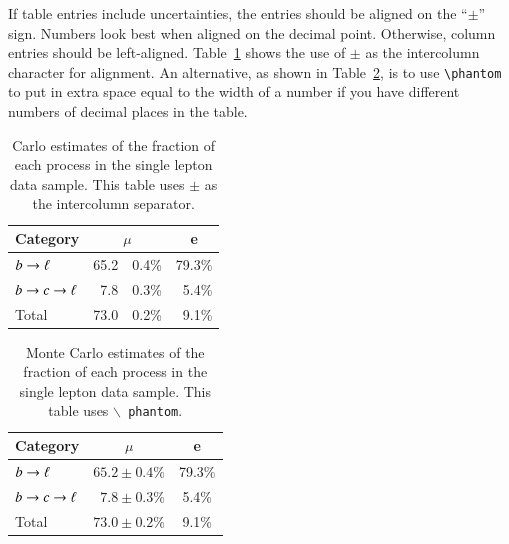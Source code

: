 \documentclass[11pt,a4paper]{../atlasnote}
\newcommand{\pho}{\phantom{0}}
\newcommand{\bslash}{\ensuremath{\backslash}}
\begin{document}
If table entries include uncertainties, the entries should be aligned
on the ``$\pm$'' sign. Numbers look best when aligned on the decimal
point. Otherwise, column entries should be left-aligned.
Table~\ref{tab:example1} shows the use of $\pm$ as the intercolumn
character for alignment. An alternative, as shown in
Table~\ref{tab:example2}, is to use \verb+\phantom+ to put in extra
space equal to the width of a number if you have different numbers of
decimal places in the table.


\begin{table}
  \begin{center}
    \begin{tabular}{lr@{$\pm$}lr}
      \hline \hline
      Category      & \multicolumn{2}{c}{$\mu$}&\multicolumn{1}{c}{e}\\ 
      \hline
      $b \rightarrow \ell $       &     65.2 & 0.4\%   &  79.3\% \\
      $b \rightarrow c \rightarrow \ell$     &      7.8 & 0.3\%   &   5.4\% \\
      Total          &     73.0 & 0.2\%   &   9.1\% \\ 
      \hline \hline
    \end{tabular}
  \caption[Monte Carlo purities in the single lepton sample]{%
    Carlo estimates of the fraction of each process in the single
    lepton data sample. This table uses {\tt $\pm$} as the intercolumn
    separator.}
  \label{tab:example1}
  \end{center}
\end{table}


\begin{table}
  \begin{center}
    \begin{tabular}{lcc}
      \hline \hline
      Category      & \multicolumn{1}{c}{$\mu$}&\multicolumn{1}{c}{e}\\ 
      \hline
      $b \rightarrow \ell $       & $    65.2 \pm 0.4\%$   &     79.3\% \\
      $b \rightarrow c \rightarrow \ell$     & $\pho 7.8 \pm 0.3\%$   & \pho 5.4\% \\
      Total          & $    73.0 \pm 0.2\%$   & \pho 9.1\% \\ 
      \hline \hline
    \end{tabular}
  \caption{Monte Carlo estimates of the fraction of each process in
    the single lepton data sample. This table uses {\tt \bslash
    phantom}.}
  \label{tab:example2}
  \end{center}
\end{table}
\end{document}
